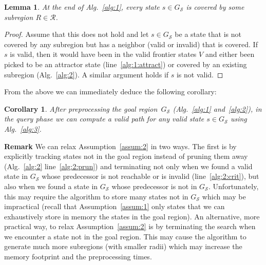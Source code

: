 \documentclass[letterpaper]{article} %
\newcommand{\calS}{\ensuremath{\mathcal{S}}\xspace}
\newcommand{\calR}{\ensuremath{\mathcal{R}}\xspace}
\newtheorem{lemma}{Lemma}
\newtheorem{cor}{Corollary}
\begin{document}
\begin{lemma}
\label{lemma:coverage}
At the end of Alg.~\ref{alg:1}, every state $s \in G_\calS$ is covered by some subregion $R \in \calR$.
\end{lemma}
\begin{proof}
Assume that this does not hold and let $s \in G_\calS$ be a state that is not covered by any subregion but has a neighbor (valid or invalid) that is covered.
%
If $s$ is valid, then it would have been in the valid frontier states $V$ and either been picked to be an attractor state (line~\ref{alg:1:attract}) or covered by an existing subregion (Alg.~\ref{alg:2}).
%
A similar argument holds if $s$ is not valid.
\end{proof}

From the above we can immediately deduce the following corollary:

\vspace{2mm}

\begin{cor}
	After preprocessing the goal region~$G_\calS$ (Alg.~\ref{alg:1} and~\ref{alg:2}), in the query phase we can compute a valid path for any valid state $s \in G_\calS$ using Alg.~\ref{alg:3}.
\end{cor}


\textbf{Remark}
We can relax Assumption~\ref{assum:2} in two ways.
The first is by explicitly tracking states not in the goal region instead of pruning them away (Alg.~\ref{alg:2} line~\ref{alg:2:prun}) and terminating not only when we found a valid state in $G_\calS$ whose predecessor is not reachable or is invalid (line~\ref{alg:2:crit}), but also when we found a state in $G_\calS$ whose predecessor is not in $G_\calS$.
Unfortunately, this may require the algorithm to store many states not in $G_\calS$  which may be impractical (recall that Assumption~\ref{assum:1} only states that we can exhaustively store in memory the states in the goal region).
An alternative, more practical way, to relax Assumption~\ref{assum:2}  is by terminating the search when we  encounter a state not in the goal region.
This may cause the algorithm to generate much more subregions (with smaller radii) which may increase the memory footprint and the preprocessing times.
\end{document}
